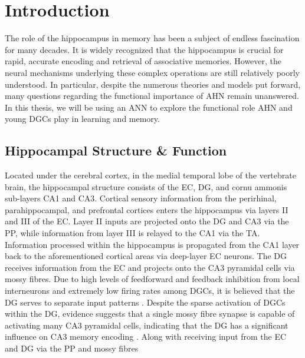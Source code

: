 \chapter{Introduction}
\label{chap:intro}
The role of the hippocampus in memory has been a subject of endless
fascination for many decades. 
It is widely recognized that
the hippocampus is crucial for rapid, accurate encoding and retrieval of
associative memories. 
However, the neural mechanisms underlying these
complex operations are still relatively poorly understood.
In particular, despite the numerous theories and models put forward, 
many questions regarding the functional importance of \ac{AHN} 
remain unanswered.
In this thesis, we will be using an \ac{ANN} to explore the functional 
role \ac{AHN} and young \acp{DGC} play in learning and memory.

\section{Hippocampal Structure \& Function}
Located under the cerebral cortex, in the medial temporal lobe of the vertebrate brain,
the hippocampal structure consists of the \ac{EC}, \ac{DG}, and cornu 
ammonis sub-layers CA1 and CA3. 
Cortical sensory information from the perirhinal, parahippocampal, 
and prefrontal cortices enters the hippocampus via layers II and III of the \ac{EC}. 
Layer II inputs are projected onto the \ac{DG} and CA3 via the \ac{PP}, while 
information from layer III is relayed to the CA1 via the \ac{TA}. 
Information processed within 
the hippocampus is propagated from the CA1 layer back to the aforementioned 
cortical areas via deep-layer \ac{EC} neurons.
The \ac{DG} receives information from the \ac{EC} and projects onto the CA3 
pyramidal cells via mossy fibres. 
Due to high levels of feedforward and feedback 
inhibition from local interneurons and extremely low firing rates among 
\acp{DGC}, it is believed that the \ac{DG} serves 
to separate input patterns \citep{jung-mcnaughton-93,chawla-et-al-05, rolls-1987, oreilly_hippocampal_encoding_storage_and_recall, rolls-treves-1998}. 
Despite the sparse activation of \acp{DGC} 
within the \ac{DG}, evidence suggests that a single mossy fibre synapse is capable 
of activating many CA3 pyramidal cells, indicating that the \ac{DG} has a significant influence on 
CA3 memory encoding \citep{mcnaughton-morris-87,treves-rolls-92,
oreilly_hippocampal_encoding_storage_and_recall,
mcclelland-mcnaughton-oreilly-95,myers-scharfman-09}.
Along with receiving input from the \ac{EC} and \ac{DG} via the \ac{PP} and mossy fibres 
